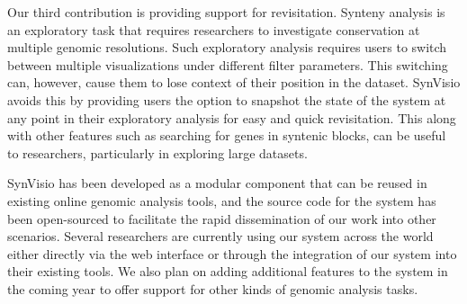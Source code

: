Our third contribution is providing support for revisitation. Synteny analysis is an exploratory task that requires researchers to investigate conservation at multiple genomic resolutions. Such exploratory analysis requires users to switch between multiple visualizations under different filter parameters. This switching can, however, cause them to lose context of their position in the dataset. SynVisio avoids this by providing users the option to snapshot the state of the system at any point in their exploratory analysis for easy and quick revisitation. This along with other features such as searching for genes in syntenic blocks, can be useful to researchers, particularly in exploring large datasets.

SynVisio has been developed as a modular component that can be reused in existing online genomic analysis tools, and the source code for the system has been open-sourced to facilitate the rapid dissemination of our work into other scenarios. Several researchers are currently using our system across the world either directly via the web interface or through the integration of our system into their existing tools. We also plan on adding additional features to the system in the coming year to offer support for other kinds of genomic analysis tasks.
